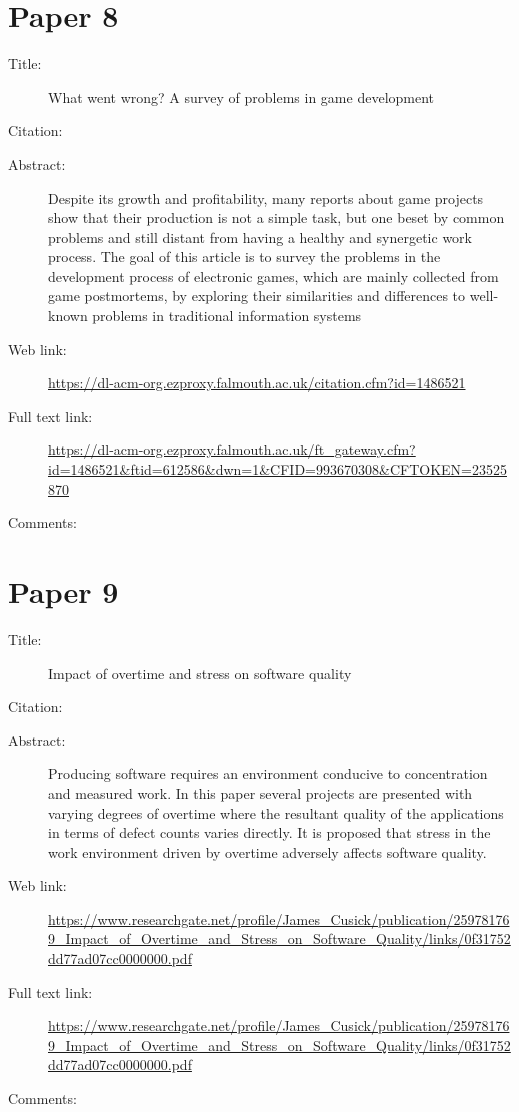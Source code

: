 \documentclass{scrartcl}
\begin{document}
\section*{Paper 8}
\begin{description}
\item[Title:]What went wrong? A survey of problems in game development
\item[Citation:] \cite{petrillo2009went}
\item[Abstract:]Despite its growth and profitability, many reports about game projects show that their production is not a simple task, but one beset by common problems and still distant from having a healthy and synergetic work process. The goal of this article is to survey the problems in the development process of electronic games, which are mainly collected from game postmortems, by exploring their similarities and differences to well-known problems in traditional information systems
\item[Web link:]\url  {https://dl-acm-org.ezproxy.falmouth.ac.uk/citation.cfm?id=1486521}
\item[Full text link:] \url {https://dl-acm-org.ezproxy.falmouth.ac.uk/ft_gateway.cfm?id=1486521&ftid=612586&dwn=1&CFID=993670308&CFTOKEN=23525870}
\item[Comments:]
\end{description}

\section*{Paper 9}
\begin{description}
\item[Title:] Impact of overtime and stress on software quality
\item[Citation:] \cite{akula2008impact}
\item[Abstract:] Producing software requires an environment conducive to concentration and measured work. In this paper several projects are presented with varying degrees of overtime where the resultant quality of the applications in terms of defect counts varies directly. It is proposed that stress in the work environment driven by overtime adversely affects software quality.
\item[Web link:] \url {https://www.researchgate.net/profile/James_Cusick/publication/259781769_Impact_of_Overtime_and_Stress_on_Software_Quality/links/0f31752dd77ad07cc0000000.pdf}
\item[Full text link:]\url  {https://www.researchgate.net/profile/James_Cusick/publication/259781769_Impact_of_Overtime_and_Stress_on_Software_Quality/links/0f31752dd77ad07cc0000000.pdf}
\item[Comments:] 
\end{description}
\end{document}
